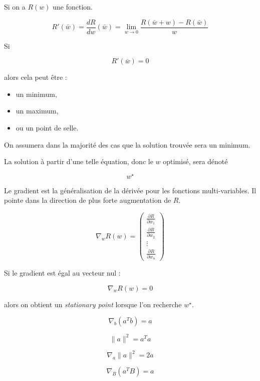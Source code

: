 \documentclass[11pt,a4paper,openany]{book}
\begin{document}
\begin{rembox}[title=Rappels -- Dérivée et optimalité]
Si on a $R(w)$ une fonction.

\vspace{0.3cm}

\[
R'(\bar{w})
=
\frac{dR}{dw}(\bar{w})
=
\lim_{w \to 0}
\frac{R(\bar{w} + w) - R(\bar{w})}{w}
\]

\vspace{0.3cm}

Si

\[
R'(\bar{w}) = 0
\]

alors cela peut être :
\begin{itemize}
    \item un minimum,
    \item un maximum,
    \item ou un point de selle.
\end{itemize}

On assumera dans la majorité des cas que la solution trouvée sera un minimum.

\vspace{0.3cm}

La solution à partir d'une telle équation, donc le $w$ optimisé, sera dénoté

\[
w^\star
\]
\end{rembox}

\begin{defnbox}[title=Gradient]
Le gradient est la généralisation de la dérivée pour les fonctions multi-variables. Il pointe dans la direction de plus forte augmentation de $R$.

\[
\nabla_{w} R(w)
=
\begin{pmatrix}
\frac{\partial R}{\partial w_1} \\
\frac{\partial R}{\partial w_2} \\
\vdots \\
\frac{\partial R}{\partial w_n}
\end{pmatrix}
\]

\vspace{0.3cm}

Si le gradient est égal au vecteur nul :

\[
\nabla_w R(w) = 0
\]

alors on obtient un \textit{stationary point} lorsque l'on recherche $w^\star$.
\end{defnbox}

\begin{propbox}[title=Useful Identities]
\[
\nabla_b (a^T b) = a
\]

\[
\|a\|^2 = a^T a
\]

\[
\nabla_a \|a\|^2 = 2a
\]

\[
\nabla_B (a^T B) = a
\]
\end{propbox}
\end{document}

